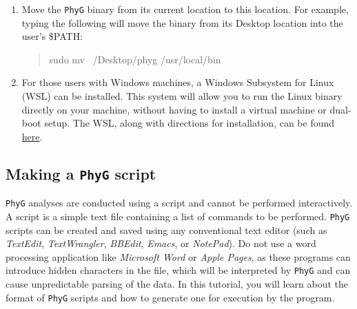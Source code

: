\documentclass[11pt]{article}
\newcommand{\phyg}{\texttt{PhyG} }
\begin{document}
\begin{enumerate}
	\begin{quote}
  	/Applications/phyg ~/Desktop/phygfiles/dec\_run1.pg
	\end{quote}
	
see also below \ref{subsec:executing})
	
\item Move the \phyg binary from its current location to this location. For example, 
typing the following will move the binary from its Desktop location into the user's 
\$PATH:

	\begin{quote}
	sudo mv ~/Desktop/phyg /usr/local/bin
	\end{quote}	
	
\item For those users with Windows machines, a Windows Subsystem for Linux 
(WSL) can be installed. This system will allow you to run the Linux binary directly 
on your machine, without having to install a virtual machine or dual-boot setup. 
The WSL, along with directions for installation, can be found 
\href{https://learn.microsoft.com/en-us/windows/wsl/}{here}.
\end{enumerate}

\subsection{Making a \phyg script}
\label{subsec:Scripts}

\phyg analyses are conducted using a script and cannot be performed interactively. 
A script is a simple text file containing a list of commands to be performed. \phyg 
scripts can be created and saved using any conventional text editor (such as 
\textit{TextEdit}, \textit{TextWrangler}, \textit{BBEdit}, \textit{Emacs}, or \textit{NotePad}). 
Do not use a word processing application like \emph{Microsoft Word} or \emph{Apple 
Pages}, as these programs can introduce hidden characters in the file, which will be 
interpreted by \phyg and can cause unpredictable parsing of the data. In this tutorial, 
you will learn about the format of \phyg scripts and how to generate one for execution 
by the program.
\end{document}
